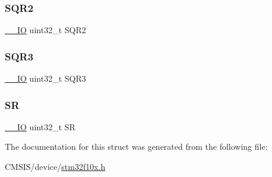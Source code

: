 \subsubsection{\texorpdfstring{SQR2}{SQR2}}
{\footnotesize\ttfamily \mbox{\hyperlink{core__sc300_8h_aec43007d9998a0a0e01faede4133d6be}{\+\_\+\+\_\+\+IO}} uint32\+\_\+t S\+Q\+R2}

\mbox{\label{struct_a_d_c___type_def_a97e40d9928fa25a5628d6442f0aa6c0f}} 
\subsubsection{\texorpdfstring{SQR3}{SQR3}}
{\footnotesize\ttfamily \mbox{\hyperlink{core__sc300_8h_aec43007d9998a0a0e01faede4133d6be}{\+\_\+\+\_\+\+IO}} uint32\+\_\+t S\+Q\+R3}

\mbox{\label{struct_a_d_c___type_def_af6aca2bbd40c0fb6df7c3aebe224a360}} 
\subsubsection{\texorpdfstring{SR}{SR}}
{\footnotesize\ttfamily \mbox{\hyperlink{core__sc300_8h_aec43007d9998a0a0e01faede4133d6be}{\+\_\+\+\_\+\+IO}} uint32\+\_\+t SR}



The documentation for this struct was generated from the following file\+:\begin{DoxyCompactItemize}
\item 
C\+M\+S\+I\+S/device/\mbox{\hyperlink{stm32f10x_8h}{stm32f10x.\+h}}\end{DoxyCompactItemize}
